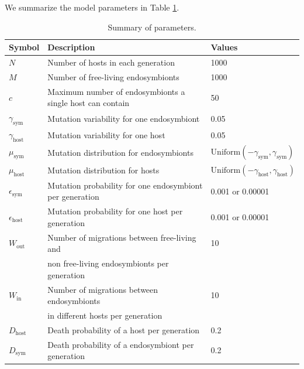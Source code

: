 \documentclass[a4paper]{article}
\begin{document}
We summarize the model parameters in Table \ref{table:parameters}. 
 
 
\begin{table}[H]
\begin{centering}
\begin{tabular}{lll}
{\bf Symbol} & {\bf Description} & {\bf Values}  \\ \hline \hline
  $N$ &  Number of hosts in each generation & 1000 \\ \hline 
  $M$ &  Number of free-living endosymbionts & 1000 \\ \hline 
  $c$ &  Maximum number of endosymbionts a single host can contain & 50 \\ \hline 
  $\gamma_{\text{sym}}$ &  Mutation variability for one endosymbiont & 0.05 \\ \hline 
  $\gamma_{\text{host}}$ &  Mutation variability for one host & 0.05 \\ \hline
  $\mu_{\text{sym}}$ &  Mutation distribution for endosymbionts & $\text{Uniform}\left( -\gamma_{\text{sym}},\gamma_{\text{sym}} \right)$ \\ \hline
  $\mu_{\text{host}}$ &  Mutation distribution for hosts & $\text{Uniform}\left( -\gamma_{\text{host}},\gamma_{\text{host}} \right)$ \\ \hline 
  $\epsilon_{\text{sym}}$ &  Mutation probability for one endosymbiont per generation & 0.001 or 0.00001 \\ \hline 
  $\epsilon_{\text{host}}$ &  Mutation probability for one host per generation & 0.001 or 0.00001 \\ \hline 
  $W_{\text{out}}$ &  Number of migrations between free-living and & 10 \\ 
  &  non free-living endosymbionts per generation &  \\ \hline 
  $W_{\text{in}}$ &  Number of migrations between endosymbionts & 10 \\
  & in different hosts per generation & \\ \hline 
  $D_{\text{host}}$ &  Death probability of a host per generation & 0.2 \\ \hline 
  $D_{\text{sym}}$ &  Death probability of a endosymbiont per generation  &  0.2 \\ \hline \hline
\end{tabular}
\end{centering}
\caption{Summary of parameters.}
\label{table:parameters}
\end{table}
\end{document}
